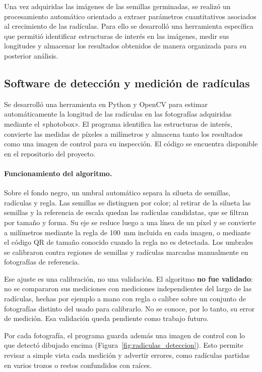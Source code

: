 Una vez adquiridas las imágenes de las semillas germinadas, se realizó un procesamiento automático orientado a extraer parámetros cuantitativos asociados al crecimiento de las radículas. Para ello se desarrolló una herramienta específica que permitió identificar estructuras de interés en las imágenes, medir sus longitudes y almacenar los resultados obtenidos de manera organizada para su posterior análisis.

\subsection{Software de detección y medición de radículas}

Se desarrolló una herramienta en Python y OpenCV para estimar automáticamente la longitud de las radículas en las fotografías adquiridas mediante el «photobox». El programa identifica las estructuras de interés, convierte las medidas de píxeles a milímetros y almacena tanto los resultados como una imagen de control para su inspección. El código se encuentra disponible en el repositorio del proyecto.

\paragraph{Funcionamiento del algoritmo.}

Sobre el fondo negro, un umbral automático separa la silueta de semillas, radículas y regla. Las semillas se distinguen por color; al retirar de la silueta las semillas y la referencia de escala quedan las radículas candidatas, que se filtran por tamaño y forma. Su eje se reduce luego a una línea de un píxel y se convierte a milímetros mediante la regla de 100~mm incluida en cada imagen, o mediante el código QR de tamaño conocido cuando la regla no es detectada. Los umbrales se calibraron contra regiones de semillas y radículas marcadas manualmente en fotografías de referencia.

Ese ajuste es una calibración, no una validación. El algoritmo \textbf{no fue validado}: no se compararon sus mediciones con mediciones independientes del largo de las radículas, hechas por ejemplo a mano con regla o calibre sobre un conjunto de fotografías distinto del usado para calibrarlo. No se conoce, por lo tanto, su error de medición. Esa validación queda pendiente como trabajo futuro.

Por cada fotografía, el programa guarda además una imagen de control con lo que detectó dibujado encima (Figura~\ref{fig:radiculas_deteccion}). Esto permite revisar a simple vista cada medición y advertir errores, como radículas partidas en varios trozos o restos confundidos con raíces.

